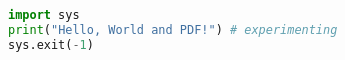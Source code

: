 \documentclass{article}
\begin{document}
\begin{lstlisting}[language=Python]
import sys
print("Hello, World and PDF!") # experimenting
sys.exit(-1)
\end{lstlisting}
\end{document}
